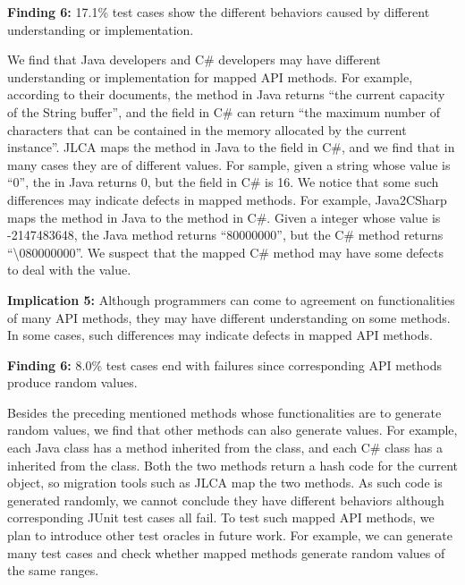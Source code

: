 \textbf{Finding 6:} 17.1\% test cases show the different behaviors caused by different understanding or implementation.

We find that Java developers and C\# developers may have different understanding or implementation for mapped API methods. For example, according to their documents, the  method in Java returns ``the current capacity of the String buffer'', and the  field in C\# can return ``the maximum number of characters that can be contained in the memory allocated by the current instance''. JLCA maps the method in Java to the field in C\#, and we find that in many cases they are of different values. For sample, given a string whose value is ``0'', the  in Java returns 0, but the  field in C\# is 16. We notice that some such differences may indicate defects in mapped methods. For example, Java2CSharp maps the  method in Java to the  method in C\#. Given a integer whose value is -2147483648, the Java method returns ``80000000'', but the C\# method returns ``\textbackslash080000000''. We suspect that the mapped C\# method may have some defects to deal with the value.

\textbf{Implication 5:} Although programmers can come to agreement on functionalities of many API methods, they may have different understanding on some methods. In some cases, such differences may indicate defects in mapped API methods.

\textbf{Finding 6:} 8.0\% test cases end with failures since corresponding API methods produce random values.

Besides the preceding mentioned methods whose functionalities are to generate random values, we find that other methods can also generate values. For example, each Java class has a  method inherited from the  class, and each C\# class has a  inherited from the  class. Both the two methods return a hash code for the current object, so migration tools such as JLCA map the two methods. As such code is generated randomly, we cannot conclude they have different behaviors although corresponding JUnit test cases all fail. To test such mapped API methods, we plan to introduce other test oracles in future work. For example, we can generate many test cases and check whether mapped methods generate random values of the same ranges.

